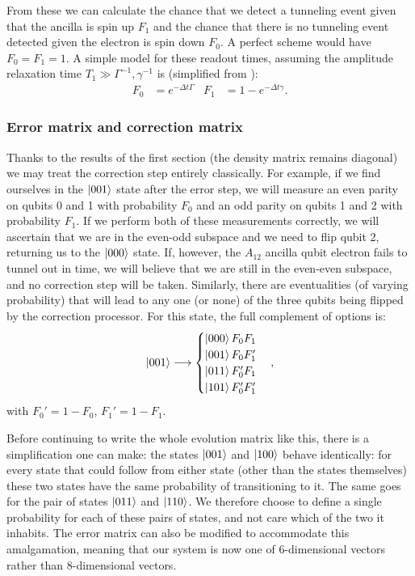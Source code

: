 \documentclass{report}
\begin{document}
\begin{appendices}
From these we can calculate the chance that we detect a tunneling event given that the ancilla is spin up $F_1$ and the chance that there is no tunneling event detected given the electron is spin down $F_0$. A perfect scheme would have $F_0 = F_1 = 1$. A simple model for these readout times, assuming the amplitude relaxation time $T_1 \gg \Gamma^{-1}, \gamma^{-1}$ is (simplified from \cite{Keith2019}):
\begin{align*}
    F_0 &= e^{-\Delta t \Gamma} & F_1 &= 1-e^{-\Delta t \gamma}.
\end{align*}
\subsubsection{Error matrix and correction matrix}
Thanks to the results of the first section (the density matrix remains diagonal) we may treat the correction step entirely classically. For example, if we find ourselves in the $\ket{001}$ state after the error step, we will measure an even parity on qubits 0 and 1 with probability $F_0$ and an odd parity on qubits 1 and 2 with probability $F_1$. If we perform both of these measurements correctly, we will ascertain that we are in the even-odd subspace and we need to flip qubit 2, returning us to the $\ket{000}$ state. If, however, the $A_{12}$ ancilla qubit electron fails to tunnel out in time, we will believe that we are still in the even-even subspace, and no correction step will be taken. Similarly, there are eventualities (of varying probability) that will lead to any one (or none) of the three qubits being flipped by the correction processor. For this state, the full complement of options is:
\begin{equation*}
\ket{001} \longrightarrow 
\begin{cases} 
      \ket{000} F_0 F_1 \\
      \ket{001} F_0 F_1' \\
      \ket{011} F_0' F_1 \\
      \ket{101} F_0' F_1'
   \end{cases},
\end{equation*}
with $F_0' = 1-F_0$, $F_1' = 1-F_1$.

Before continuing to write the whole evolution matrix like this, there is a simplification one can make: the states $\ket{001}$ and $\ket{100}$ behave identically: for every state that could follow from either state (other than the states themselves) these two states have the same probability of transitioning to it. The same goes for the pair of states $\ket{011}$ and $\ket{110}$. We therefore choose to define a single probability for each of these pairs of states, and not care which of the two it inhabits. The error matrix can also be modified to accommodate this amalgamation, meaning that our system is now one of 6-dimensional vectors rather than 8-dimensional vectors.


\end{appendices}
\end{document}
